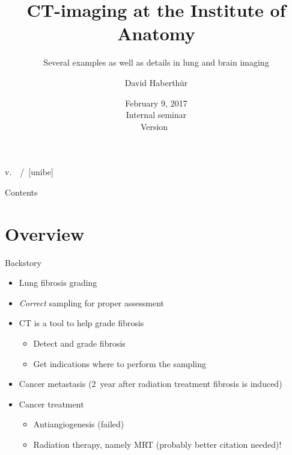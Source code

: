 \documentclass[draft,caption=numbered]{beamer}
\subtitle{Several examples as well as details in lung and brain imaging}
\author[DH]{David Haberthür}
\institute{Institute of Anatomy\\Universität Bern}
\date{February 9, 2017\\Internal seminar\\Version~\gitAbbrevHash}
\newcommand{\uct}{\si{\micro}CT\xspace}
\begin{document}
\title[\si{\micro}CT in biological studies]{\si{\micro}CT-imaging at the Institute of Anatomy} %

{%
	\hspace*{\fill}%
	\insertauthor%
	\hspace*{\fill}%
	\insertshorttitle%
	\hspace*{\fill}%
	v.~\gitAbbrevHash%
	\hspace*{\fill}%
	\insertpagenumber\,/\,\insertpresentationendpage%
	\hspace*{\fill}%
	\vskip2pt%
}
[unibe]

{
\begin{frame}
  \titlepage
\end{frame}
}
\addtocounter{framenumber}{1}

\begin{frame}{Contents}
	\tableofcontents
\end{frame}

\section{Overview}
\begin{frame}{Backstory}
    \begin{itemize}
        \item Lung fibrosis grading \cite{Ashcroft1988a}
        \item \emph{Correct} sampling for proper assessment
        \item \uct is a tool to help grade fibrosis
        \begin{itemize}
            \item Detect and grade fibrosis
            \item Get indications where to perform the sampling
        \end{itemize}
        \item Cancer metastasis (\SI{2}{year} after radiation treatment fibrosis is induced)
        \item Cancer treatment
        \begin{itemize}
            \item Antiangiogenesis (failed)
            \item Radiation therapy, namely MRT \cite{Bronnimann2016} (probably better citation needed)!
        \end{itemize}
    \end{itemize}
\end{frame}
\end{document}
